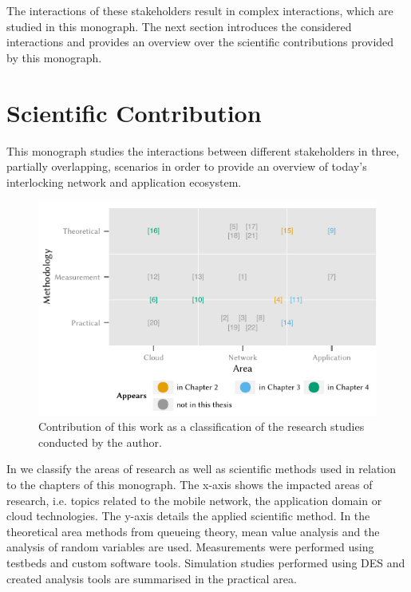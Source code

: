 The interactions of these stakeholders result in complex interactions, which are studied in this monograph.
The next section introduces the considered interactions and provides an overview over the scientific contributions provided by this monograph.

\section{Scientific Contribution}\label{sec:introduction:scientific_contribution}
This monograph studies the interactions between different stakeholders in three, partially overlapping, scenarios in order to provide an overview of today's interlocking network and application ecosystem.

\begin{figure}
\centering
\includegraphics{figures/publications}
\caption{Contribution of this work as a classification of the research studies conducted by the author.}\label{fig:introduction:publications}
\end{figure}

In  we classify the areas of research as well as scientific methods used in relation to the chapters of this monograph.
The x-axis shows the impacted areas of research, i.e. topics related to the mobile network, the application domain or cloud technologies.
The y-axis details the applied scientific method.
In the theoretical area methods from queueing theory, mean value analysis and the analysis of random variables are used.
Measurements were performed using testbeds and custom software tools.
Simulation studies performed using \gls{DES} and created analysis tools are summarised in the practical area.

